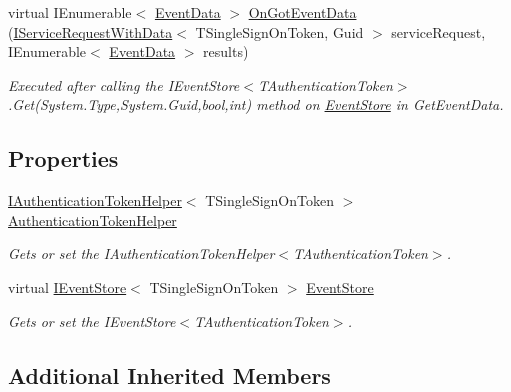\begin{DoxyCompactItemize}
virtual I\+Enumerable$<$ \hyperlink{classCqrs_1_1Events_1_1EventData}{Event\+Data} $>$ \hyperlink{classCqrs_1_1WebApi_1_1CqrsEventApiController_a9f0147c846a7fd7628d199ff268d178e_a9f0147c846a7fd7628d199ff268d178e}{On\+Got\+Event\+Data} (\hyperlink{interfaceCqrs_1_1Services_1_1IServiceRequestWithData}{I\+Service\+Request\+With\+Data}$<$ T\+Single\+Sign\+On\+Token, Guid $>$ service\+Request, I\+Enumerable$<$ \hyperlink{classCqrs_1_1Events_1_1EventData}{Event\+Data} $>$ results)
\begin{DoxyCompactList}\small\item\em Executed after calling the I\+Event\+Store$<$\+T\+Authentication\+Token$>$.\+Get(\+System.\+Type,\+System.\+Guid,bool,int) method on \hyperlink{namespaceCqrs_1_1EventStore}{Event\+Store} in Get\+Event\+Data. \end{DoxyCompactList}\end{DoxyCompactItemize}
\subsection*{Properties}
\begin{DoxyCompactItemize}
\item 
\hyperlink{interfaceCqrs_1_1Authentication_1_1IAuthenticationTokenHelper}{I\+Authentication\+Token\+Helper}$<$ T\+Single\+Sign\+On\+Token $>$ \hyperlink{classCqrs_1_1WebApi_1_1CqrsEventApiController_ac5f102242d785de8f366b380a7f54503_ac5f102242d785de8f366b380a7f54503}{Authentication\+Token\+Helper}
\begin{DoxyCompactList}\small\item\em Gets or set the I\+Authentication\+Token\+Helper$<$\+T\+Authentication\+Token$>$. \end{DoxyCompactList}\item 
virtual \hyperlink{interfaceCqrs_1_1Events_1_1IEventStore}{I\+Event\+Store}$<$ T\+Single\+Sign\+On\+Token $>$ \hyperlink{classCqrs_1_1WebApi_1_1CqrsEventApiController_a5d008d6964d062848e47f81b104beed6_a5d008d6964d062848e47f81b104beed6}{Event\+Store}
\begin{DoxyCompactList}\small\item\em Gets or set the I\+Event\+Store$<$\+T\+Authentication\+Token$>$. \end{DoxyCompactList}\end{DoxyCompactItemize}
\subsection*{Additional Inherited Members}


